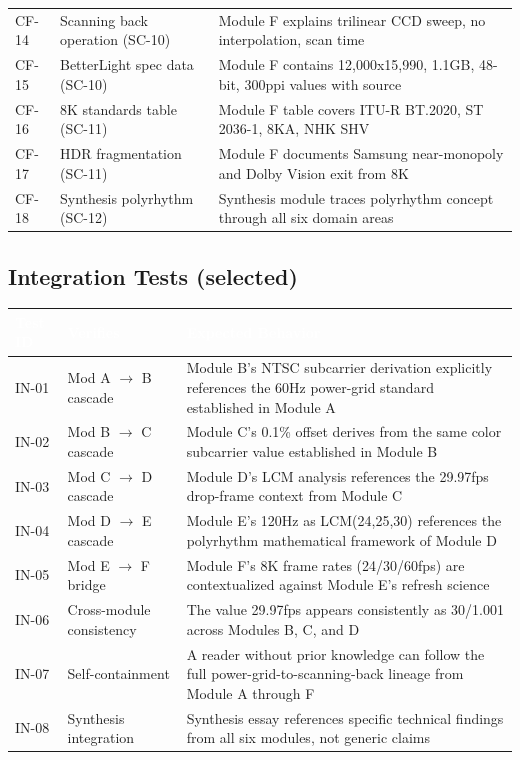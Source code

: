 \documentclass[11pt,letterpaper]{article}
\newcommand{\tableheader}[1]{\textbf{\sffamily\textcolor{white}{#1}}}
\begin{document}
\begin{center}
\begin{tabularx}{\textwidth}{L{1.5cm}L{3.5cm}X}
CF-14 & Scanning back operation (SC-10) & Module F explains trilinear CCD sweep, no interpolation, scan time \\
CF-15 & BetterLight spec data (SC-10) & Module F contains 12,000x15,990, 1.1GB, 48-bit, 300ppi values with source \\
CF-16 & 8K standards table (SC-11) & Module F table covers ITU-R BT.2020, ST 2036-1, 8KA, NHK SHV \\
CF-17 & HDR fragmentation (SC-11) & Module F documents Samsung near-monopoly and Dolby Vision exit from 8K \\
CF-18 & Synthesis polyrhythm (SC-12) & Synthesis module traces polyrhythm concept through all six domain areas \\
\bottomrule
\end{tabularx}
\end{center}

\subsection{Integration Tests (selected)}

\begin{center}
\begin{tabularx}{\textwidth}{L{1.5cm}L{4cm}X}
\toprule
{}
\tableheader{Test ID} & \tableheader{Verifies} & \tableheader{Expected Behavior} \\
\midrule
IN-01 & Mod A $\rightarrow$ B cascade & Module B's NTSC subcarrier derivation explicitly references the 60Hz power-grid standard established in Module A \\
IN-02 & Mod B $\rightarrow$ C cascade & Module C's 0.1\% offset derives from the same color subcarrier value established in Module B \\
IN-03 & Mod C $\rightarrow$ D cascade & Module D's LCM analysis references the 29.97fps drop-frame context from Module C \\
IN-04 & Mod D $\rightarrow$ E cascade & Module E's 120Hz as LCM(24,25,30) references the polyrhythm mathematical framework of Module D \\
IN-05 & Mod E $\rightarrow$ F bridge & Module F's 8K frame rates (24/30/60fps) are contextualized against Module E's refresh science \\
IN-06 & Cross-module consistency & The value 29.97fps appears consistently as 30/1.001 across Modules B, C, and D \\
IN-07 & Self-containment & A reader without prior knowledge can follow the full power-grid-to-scanning-back lineage from Module A through F \\
IN-08 & Synthesis integration & Synthesis essay references specific technical findings from all six modules, not generic claims \\
\bottomrule
\end{tabularx}
\end{center}
\end{document}
